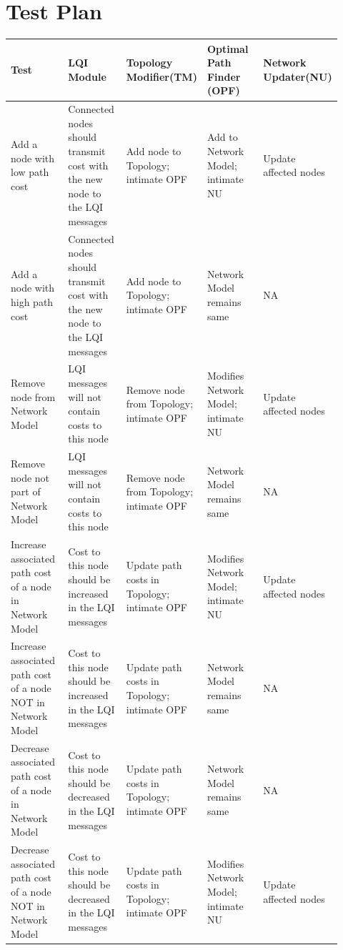 \documentclass{article}
\begin{document}
\section{Test Plan}
\begin{tabular}{  | p{0.185\linewidth} | p{0.185\linewidth} | p{0.185\linewidth} | p{0.185\linewidth} | p{0.185\linewidth} |}
\hline
\textbf{Test}	&	\textbf{LQI Module}	&	\textbf{Topology Modifier(TM)}	&	\textbf{Optimal Path Finder (OPF)}	&
\textbf{Network Updater(NU)}\\ 
\hline \hline
Add a node with low path cost	&	Connected nodes should transmit cost with the new node to the LQI messages	&	Add node to Topology; intimate OPF	&	Add to Network Model; intimate NU	&	Update affected nodes\\ 
\hline
Add a node with high path cost	&	Connected nodes should transmit cost with the new node to the LQI messages	&	Add node to Topology; intimate OPF	&	Network Model remains same	&	NA\\ 
\hline
Remove node from Network Model	&	LQI messages will not contain costs to this node	&	Remove node from Topology; intimate OPF	&	Modifies Network Model; intimate NU	&	Update affected nodes\\ 
\hline
Remove node not part of Network Model	&	LQI messages will not contain costs to this node	&	Remove node from Topology; intimate OPF	&	Network Model remains same	&	NA\\ 
\hline
Increase associated path cost of a node in Network Model	&	Cost to this node should be increased in the LQI messages	&	Update path costs in Topology; intimate OPF	&	Modifies Network Model; intimate NU	&	Update affected nodes\\ 
\hline
Increase associated path cost of a node NOT in Network Model	&	Cost to this node should be increased in the LQI messages	&	Update path costs in Topology; intimate OPF	&	Network Model remains same	&	NA\\ 
\hline
Decrease associated path cost of a node in Network Model	&	Cost to this node should be decreased in the LQI messages	&	Update path costs in Topology; intimate OPF	&	Network Model remains same	&	NA\\ 
\hline
Decrease associated path cost of a node NOT in Network Model	&	Cost to this node should be decreased in the LQI messages	&	Update path costs in Topology; intimate OPF	&	Modifies Network Model; intimate NU	&	Update affected nodes \\
\hline
\end{tabular}
\end{document}
